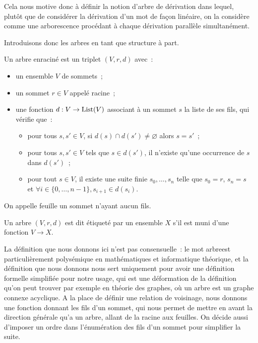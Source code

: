 Cela nous motive donc à définir la notion d'arbre de dérivation dans lequel,
plutôt que de considérer la dérivation d'un mot de façon linéaire, on la
considère comme une arborescence procédant à chaque dérivation parallèle
simultanément.

Introduisons donc les arbres en tant que structure à part.

\begin{definition}
  Un arbre enraciné est un triplet $(V,r,d)$ avec~:
  \begin{itemize}
  \item un ensemble $V$ de sommets~;
  \item un sommet $r \in V$ appelé racine~;
  \item une fonction $d : V \to \operatorname{List}(V)$ associant à un sommet $s$
    la liste de ses fils, qui vérifie que~:
    \begin{itemize}
    \item pour tous $s,s'\in V$, si $d(s) \cap d(s')\neq\varnothing$ alors
      $s = s'$~;
    \item pour tous $s,s' \in V$ tels que $s \in d(s')$, il n'existe qu'une
      occurrence de $s$ dans $d(s')$~;
    \item pour tout $s \in V$, il existe une suite finie $s_0,\ldots,s_n$ telle
      que $s_0 = r$, $s_n = s$ et
      $\forall i \in \{0,\ldots,n-1\},s_{i+1} \in d(s_i)$.
    \end{itemize}
  \end{itemize}

  On appelle feuille un sommet n'ayant aucun fils.

  Un arbre $(V,r,d)$ est dit étiqueté par un ensemble $X$ s'il est muni d'une
  fonction $V \to X$.
\end{definition}

\begin{remark}
  La définition que nous donnons ici n'est pas consensuelle~: le mot
  \og arbre\fg est particulièrement polysémique en mathématiques et informatique
  théorique, et la définition que nous donnons nous sert uniquement pour avoir
  une définition formelle simplifiée pour notre usage, qui est une déformation
  de la définition qu'on peut trouver par exemple en théorie des graphes, où un
  arbre est un graphe connexe acyclique. A la place de définir une relation de
  voisinage, nous donnons une fonction donnant les fils d'un sommet, qui nous
  permet de mettre en avant la direction générale qu'a un arbre, allant de la
  racine aux feuilles. On décide aussi d'imposer un ordre dans l'énumération des
  fils d'un sommet pour simplifier la suite.
\end{remark}

